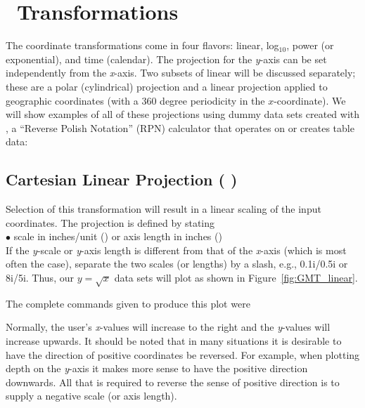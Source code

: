 %
%
\chapter{\gmt\ Transformations}

The coordinate transformations come in four flavors: linear, log$_{10}$,
power (or exponential), and time (calendar).  The projection for the {\it y}-axis can be set
independently from the {\it x}-axis.  Two subsets of linear will be discussed
separately; these are a polar (cylindrical) projection and a linear projection applied to
geographic coordinates (with a 360 degree periodicity in the $x$-coordinate).  We will show examples
of all of these projections using dummy data sets created with
, a ``Reverse Polish Notation'' (RPN) calculator that
operates on or creates table data: 


\section{Cartesian Linear Projection ( )}

Selection of this transformation will result in a linear scaling
of the input coordinates.  The projection is defined by stating \\

$\bullet$ scale in inches/unit () or axis
length in inches () \\

If the {\it y}-scale or {\it y}-axis length is different from that of
the {\it x}-axis (which is most often the case), separate the two
scales (or lengths) by a slash, e.g., 0.1i/0.5i or 8i/5i. 
Thus, our $y = \sqrt{x}$ data sets will plot as shown
in Figure~\ref{fig:GMT_linear}.


The complete commands given to produce this plot were 



Normally, the user's {\it x}-values will increase to the right
and the {\it y}-values will increase upwards.  It should be noted
that in many situations it is desirable to have the direction of
positive coordinates be reversed.  For example, when plotting
depth on the {\it y}-axis it makes more sense to have the positive
direction downwards.  All that is required to reverse the sense of
positive direction is to supply a negative scale (or axis length).

